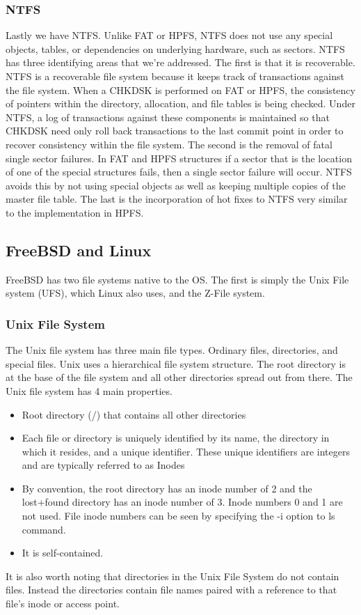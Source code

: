 \documentclass[a4paper,10pt,onecolumn]{article}
\begin{document}
\subsubsection{NTFS}
Lastly we have NTFS. Unlike FAT or HPFS, NTFS does not use any special objects, tables, or dependencies on underlying hardware, such as sectors. 
\newline
\newline
NTFS has three identifying areas that we're addressed. The first is that it is recoverable. NTFS is a recoverable file system because it keeps track of transactions against the file system. When a CHKDSK is performed on FAT or HPFS, the consistency of pointers within the directory, allocation, and file tables is being checked. Under NTFS, a log of transactions against these components is maintained so that CHKDSK need only roll back transactions to the last commit point in order to recover consistency within the file system.
\newline
\newline
The second is the removal of fatal single sector failures. In FAT and HPFS structures if a sector that is the location of one of the special structures fails, then a single sector failure will occur. NTFS avoids this by not using special objects as well as keeping multiple copies of the master file table. 
\newline
The last is the incorporation of hot fixes to NTFS very similar to the implementation in HPFS.

\subsection{FreeBSD and Linux}
FreeBSD has two file systems native to the OS. The first is simply the Unix File system {(UFS)}, which Linux also uses, and the Z-File system. 
\subsubsection{Unix File System}
The Unix file system has three main file types. Ordinary files, directories, and special files. 
Unix uses a hierarchical file system structure. The root directory is at the base of the file system and all other directories spread out from there. The Unix file system has 4 main properties.
\begin{itemize}
\item Root directory {(/)} that contains all other directories
\item Each file or directory is uniquely identified by its name, the directory in which it resides, and a unique identifier. These unique identifiers are integers and are typically referred to as Inodes
\item  By convention, the root directory has an inode number of 2 and the lost+found directory has an inode number of 3. Inode numbers 0 and 1 are not used. File inode numbers can be seen by specifying the -i option to ls command.
\item It is self-contained.
\end{itemize}
It is also worth noting that directories in the Unix File System do not contain files. Instead the directories contain file names paired with a reference to that file's inode or access point. 
\end{document}
